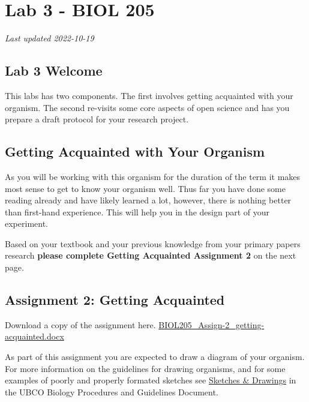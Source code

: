 \documentclass[
]{book}
\begin{document}
\hypertarget{part-lab-3---biol-205}{%
\part*{Lab 3 - BIOL 205}\label{part-lab-3---biol-205}}

\emph{Last updated 2022-10-19}

\hypertarget{lab-3-welcome}{%
\chapter*{Lab 3 Welcome}\label{lab-3-welcome}}

This labs has two components. The first involves getting acquainted with your organism. The second re-visits some core aspects of open science and has you prepare a draft protocol for your research project.

\hypertarget{getting-acquainted-with-your-organism}{%
\chapter*{Getting Acquainted with Your Organism}\label{getting-acquainted-with-your-organism}}

As you will be working with this organism for the duration of the term it makes most sense to get to know your organism well. Thus far you have done some reading already and have likely learned a lot, however, there is nothing better than first-hand experience. This will help you in the design part of your experiment.

Based on your textbook and your previous knowledge from your primary papers research \textbf{please complete Getting Acquainted Assignment 2} on the next page.

\hypertarget{assignment-2-getting-acquainted}{%
\chapter*{Assignment 2: Getting Acquainted}\label{assignment-2-getting-acquainted}}

Download a copy of the assignment here. \href{https://osf.io/download/xz2rk}{BIOL205\_Assign-2\_getting-acquainted.docx}

As part of this assignment you are expected to draw a diagram of your organism. For more information on the guidelines for drawing organisms, and for some examples of poorly and properly formated sketches see \href{https://ubco-biology.github.io/Procedures-and-Guidelines/sketches-drawings.html}{Sketches \& Drawings} in the UBCO Biology Procedures and Guidelines Document.
\end{document}
